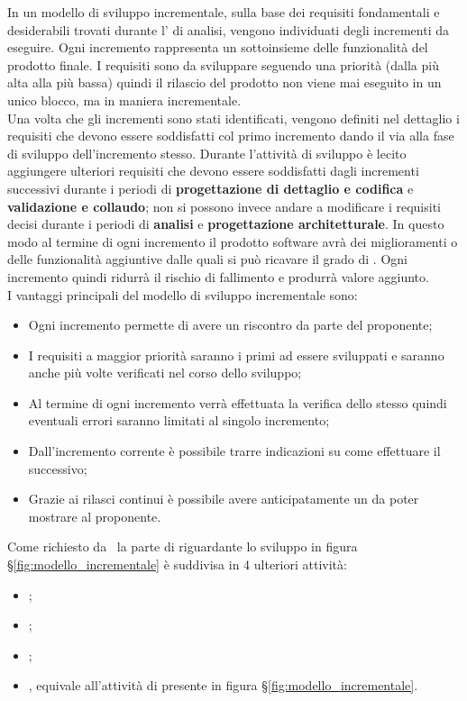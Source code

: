 In un modello di sviluppo incrementale, sulla base dei requisiti fondamentali e desiderabili trovati durante l' di analisi, vengono individuati degli incrementi da eseguire. Ogni incremento rappresenta un sottoinsieme delle funzionalità del prodotto finale. I requisiti sono da sviluppare seguendo una priorità (dalla più alta alla più bassa) quindi il rilascio del prodotto non viene mai eseguito in un unico blocco, ma in maniera incrementale.\\
Una volta che gli incrementi sono stati identificati, vengono definiti nel dettaglio i requisiti che devono essere soddisfatti col primo incremento dando il via alla fase di sviluppo dell'incremento stesso. Durante l’attività di sviluppo è lecito aggiungere ulteriori requisiti che devono essere soddisfatti dagli incrementi successivi durante i periodi di \textbf{progettazione di dettaglio e codifica} e \textbf{validazione e collaudo}; non si possono invece andare a modificare i requisiti decisi durante i periodi di \textbf{analisi} e \textbf{progettazione architetturale}. In questo modo al termine di ogni incremento il prodotto software avrà dei miglioramenti o delle funzionalità aggiuntive dalle quali si può ricavare il grado di . Ogni incremento quindi ridurrà il rischio di fallimento e produrrà valore aggiunto.\\
I vantaggi principali del modello di sviluppo incrementale sono:
\begin{itemize}
    \item Ogni incremento permette di avere un riscontro da parte del proponente;
    \item I requisiti a maggior priorità saranno i primi ad essere sviluppati e saranno anche più volte verificati nel corso dello sviluppo;
    \item Al termine di ogni incremento verrà effettuata la verifica dello stesso quindi eventuali errori saranno limitati al singolo incremento;
    \item Dall'incremento corrente è possibile trarre indicazioni su come effettuare il successivo;
    \item Grazie ai rilasci continui è possibile avere anticipatamente un  da poter mostrare al proponente.
\end{itemize}

Come richiesto da \Proponente\ la parte di  riguardante lo sviluppo in figura \S\ref{fig:modello_incrementale} è suddivisa in 4 ulteriori attività:
\begin{itemize}
    \item {};
    \item {};
    \item {};
    \item {}, equivale all'attività di  presente in figura \S\ref{fig:modello_incrementale}.
\end{itemize}